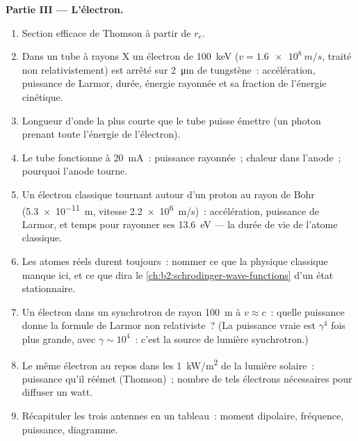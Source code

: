 \begin{problem}
\medskip
\noindent\textbf{Partie III --- L'électron.}
\begin{enumerate}[resume]
  \item Section efficace de Thomson à partir de $r_e$.
  \item Dans un tube à rayons X un électron de \qty{100}{keV} ($v = \qty{1.6e8}{m/s}$,
        traité non relativistement) est arrêté sur \qty{2}{\micro m} de
        tungstène~: accélération, puissance de Larmor, durée, énergie
        rayonnée et sa fraction de l'énergie cinétique.
  \item Longueur d'onde la plus courte que le tube puisse émettre (un photon prenant
        toute l'énergie de l'électron).
  \item Le tube fonctionne à \qty{20}{mA}~: puissance rayonnée~; chaleur dans l'anode~;
        pourquoi l'anode tourne.
  \item Un électron classique tournant autour d'un proton au rayon de Bohr
        (\qty{5.3e-11}{m}, vitesse \qty{2.2e6}{m/s})~: accélération, puissance de
        Larmor, et temps pour rayonner ses \qty{13.6}{eV} --- la
        durée de vie de l'atome classique.
  \item Les atomes réels durent toujours~: nommer ce que la physique classique manque
        ici, et ce que dira le \cref{ch:b2:schrodinger-wave-functions}
        d'un état stationnaire.
  \item Un électron dans un synchrotron de rayon \qty{100}{m} à $v \approx c$~:
        quelle puissance donne la formule de Larmor non relativiste~? (La
        puissance vraie est $\gamma^4$ fois plus grande, avec $\gamma \sim 10^4$~: c'est la
        source de lumière synchrotron.)
  \item Le même électron au repos dans les \qty{1}{kW/m^2} de la lumière solaire~:
        puissance qu'il réémet (Thomson)~; nombre de tels électrons
        nécessaires pour diffuser un watt.
  \item Récapituler les trois antennes en un tableau~: moment dipolaire,
        fréquence, puissance, diagramme.
\end{enumerate}
\end{problem}
